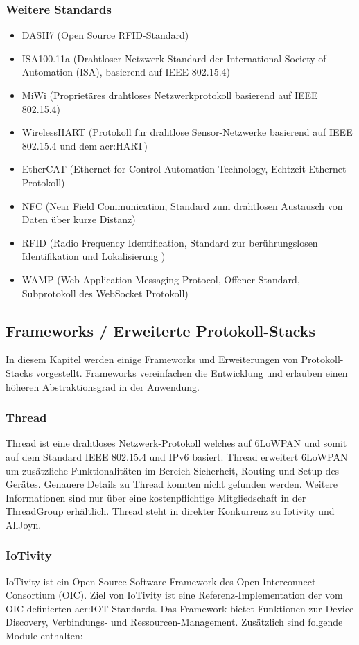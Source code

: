 \subsubsection{Weitere Standards}
\begin{itemize}
\item DASH7 (Open Source RFID-Standard)
\item ISA100.11a (Drahtloser Netzwerk-Standard der International Society of Automation (ISA), basierend auf IEEE 802.15.4)
\item MiWi (Proprietäres drahtloses Netzwerkprotokoll basierend auf IEEE 802.15.4)
\item WirelessHART (Protokoll für drahtlose Sensor-Netzwerke basierend auf IEEE 802.15.4 und dem \gls{acr:HART})
\item EtherCAT (Ethernet for Control Automation Technology, Echtzeit-Ethernet Protokoll)
\item NFC (Near Field Communication, Standard zum drahtlosen Austausch von Daten über kurze Distanz)
\item RFID (Radio Frequency Identification, Standard zur berührungslosen Identifikation und Lokalisierung )
\item WAMP (Web Application Messaging Protocol, Offener Standard, Subprotokoll des WebSocket Protokoll)
\end{itemize}


\subsection{Frameworks / Erweiterte Protokoll-Stacks}
In diesem Kapitel werden einige Frameworks und Erweiterungen von Protokoll-Stacks vorgestellt. Frameworks vereinfachen die Entwicklung und erlauben einen höheren Abstraktionsgrad in der Anwendung.


\subsubsection{Thread}
Thread ist eine drahtloses Netzwerk-Protokoll welches auf 6LoWPAN und somit auf dem Standard IEEE 802.15.4 und IPv6 basiert. Thread erweitert 6LoWPAN um zusätzliche Funktionalitäten im Bereich Sicherheit, Routing und Setup des Gerätes. Genauere Details zu Thread konnten nicht gefunden werden. Weitere Informationen sind nur über eine kostenpflichtige Mitgliedschaft in der ThreadGroup erhältlich. Thread steht in direkter Konkurrenz zu Iotivity und AllJoyn.


\subsubsection{IoTivity}
IoTivity ist ein Open Source Software Framework des Open Interconnect Consortium (OIC). Ziel von IoTivity ist eine Referenz-Implementation der vom OIC definierten \gls{acr:IOT}-Standards. Das Framework bietet Funktionen zur Device Discovery, Verbindungs- und Ressourcen-Management. Zusätzlich sind folgende Module enthalten:

